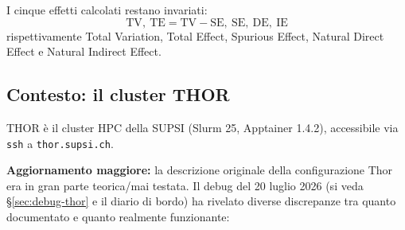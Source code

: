 I cinque effetti calcolati restano invariati:
\[
\text{TV},\ \text{TE} = \text{TV} - \text{SE},\ \text{SE},\ \text{DE},\ \text{IE}
\]
rispettivamente Total Variation, Total Effect, Spurious Effect, Natural Direct Effect e Natural Indirect Effect.

\subsection{Contesto: il cluster THOR}

THOR \`e il cluster HPC della SUPSI (Slurm 25, Apptainer 1.4.2), accessibile via \texttt{ssh} a \texttt{thor.supsi.ch}.

\textbf{Aggiornamento maggiore:} la descrizione originale della configurazione Thor era in gran parte teorica/mai testata. Il debug del 20 luglio 2026 (si veda \S\ref{sec:debug-thor} e il diario di bordo) ha rivelato diverse discrepanze tra quanto documentato e quanto realmente funzionante:

